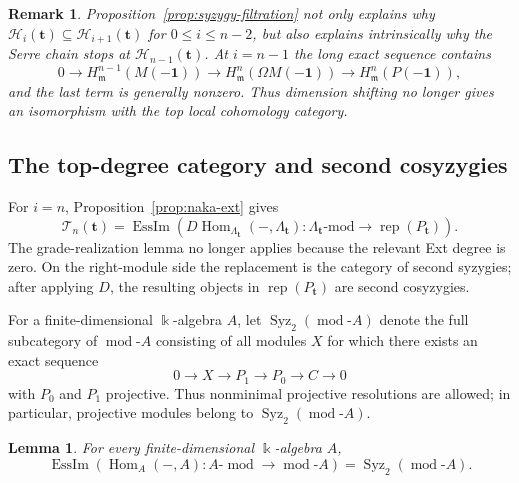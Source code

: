 \documentclass[10pt,a4paper]{amsart}
\newtheorem{lemma}[theorem]{Lemma}
\newtheorem{remark}[theorem]{Remark}
\newcommand{\Rep}{\operatorname{rep}}
\newcommand{\Hom}{\operatorname{Hom}}
\newcommand{\EssIm}{\operatorname{EssIm}}
\newcommand{\modcat}{\operatorname{mod}}
\begin{document}
\begin{remark}\label{rem:dimension-shift-stops}
Proposition~\ref{prop:syzygy-filtration} not only explains why $\mathcal H_i(\mathbf t)\subseteq\mathcal H_{i+1}(\mathbf t)$ for $0\le i\le n-2$, but also explains intrinsically why the Serre chain stops at
$\mathcal H_{n-1}(\mathbf t)$.  At $i=n-1$ the long exact sequence contains
\[
0\longrightarrow H^{n-1}_{\mathfrak m}(M(-\mathbf1))
\longrightarrow H^n_{\mathfrak m}(\Omega M(-\mathbf1))
\longrightarrow H^n_{\mathfrak m}(P(-\mathbf1)),
\]
and the last term is generally nonzero.  Thus dimension shifting no longer
gives an isomorphism with the top local cohomology category.
\end{remark}

\subsection{The top-degree category and second cosyzygies}

For $i=n$, Proposition~\ref{prop:naka-ext} gives
\[
\mathcal T_n(\mathbf t)
=
\EssIm\left(
D\Hom_{\Lambda_{\mathbf t}}(-,\Lambda_{\mathbf t})
:\Lambda_{\mathbf t}\text{-mod}\longrightarrow\Rep(P_{\mathbf t})
\right).
\]
The grade-realization lemma no longer applies because the relevant Ext degree
is zero.  On the right-module side the replacement is the category of second
syzygies; after applying $D$, the resulting objects in
$\Rep(P_{\mathbf t})$ are second cosyzygies.

For a finite-dimensional $\Bbbk$-algebra $A$, let
$\operatorname{Syz}_2(\modcat\text{-}A)$ denote the full subcategory of
$\modcat\text{-}A$ consisting of all modules $X$ for which there exists an
exact sequence
$$
0\longrightarrow X\longrightarrow P_1\longrightarrow P_0
\longrightarrow C\longrightarrow0
$$
with $P_0$ and $P_1$ projective.  Thus nonminimal projective resolutions are
allowed; in particular, projective modules belong to
$\operatorname{Syz}_2(\modcat\text{-}A)$.

\begin{lemma}\label{lem:dual-syzygy}
For every finite-dimensional $\Bbbk$-algebra $A$,
$$
\EssIm\!\left(
\Hom_A(-,A):A\text{-}\modcat\longrightarrow\modcat\text{-}A
\right)
=
\operatorname{Syz}_2(\modcat\text{-}A).
$$
\end{lemma}
\end{document}
